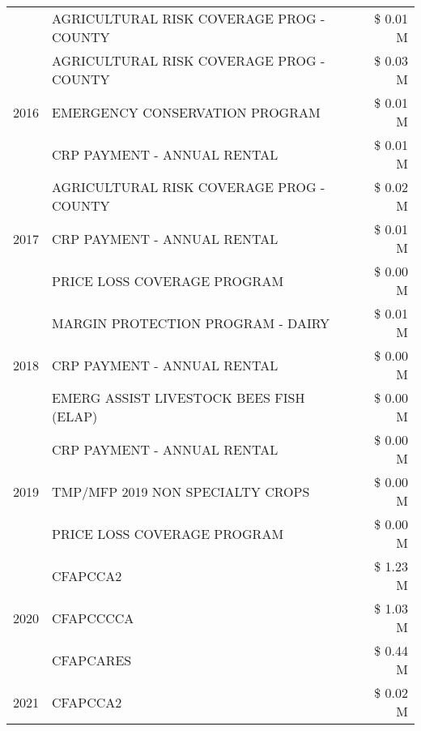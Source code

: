 \begin{tabular}{llr}
 & AGRICULTURAL RISK COVERAGE PROG - COUNTY & \$ 0.01 M \\
\cline{1-3}
\multirow[t]{3}{*}{2016} & AGRICULTURAL RISK COVERAGE PROG - COUNTY & \$ 0.03 M \\
 & EMERGENCY CONSERVATION PROGRAM & \$ 0.01 M \\
 & CRP PAYMENT - ANNUAL RENTAL & \$ 0.01 M \\
\cline{1-3}
\multirow[t]{3}{*}{2017} & AGRICULTURAL RISK COVERAGE PROG - COUNTY & \$ 0.02 M \\
 & CRP PAYMENT - ANNUAL RENTAL & \$ 0.01 M \\
 & PRICE LOSS COVERAGE PROGRAM & \$ 0.00 M \\
\cline{1-3}
\multirow[t]{3}{*}{2018} & MARGIN PROTECTION PROGRAM - DAIRY & \$ 0.01 M \\
 & CRP PAYMENT - ANNUAL RENTAL & \$ 0.00 M \\
 & EMERG ASSIST LIVESTOCK BEES FISH (ELAP) & \$ 0.00 M \\
\cline{1-3}
\multirow[t]{3}{*}{2019} & CRP PAYMENT - ANNUAL RENTAL & \$ 0.00 M \\
 & TMP/MFP 2019 NON SPECIALTY CROPS & \$ 0.00 M \\
 & PRICE LOSS COVERAGE PROGRAM & \$ 0.00 M \\
\cline{1-3}
\multirow[t]{3}{*}{2020} & CFAPCCA2 & \$ 1.23 M \\
 & CFAPCCCCA & \$ 1.03 M \\
 & CFAPCARES & \$ 0.44 M \\
\cline{1-3}
2021 & CFAPCCA2 & \$ 0.02 M \\
\cline{1-3}
\bottomrule
\end{tabular}
